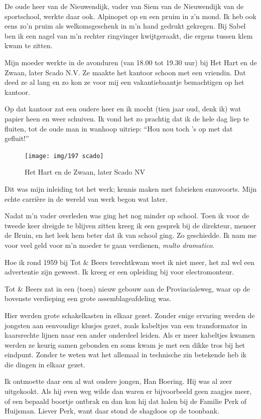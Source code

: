 \documentclass[10pt,twoside, openright]{memoir}
\begin{document}
De oude heer van de Nieuwendijk, vader van Siem van de Nieuwendijk van de sportschool, werkte daar ook. Alpinopet op en een pruim in z’n mond. Ik heb ook eens zo’n pruim als welkomsgeschenk in m’n hand gedrukt gekregen. Bij Sabel ben ik een nagel van m’n rechter ringvinger kwijtgeraakt, die ergens tussen klem kwam te zitten.

Mijn moeder werkte in de avonduren (van 18.00 tot 19.30 uur) bij Het Hart en de Zwaan, later Scado N.V. Ze maakte het kantoor schoon met een vriendin. Dat deed ze al lang en zo kon ze voor mij een vakantiebaantje bemachtigen op het kantoor. 

Op dat kantoor zat een oudere heer en ik mocht (tien jaar oud, denk ik) wat papier heen en weer schuiven. Ik vond het zo prachtig dat ik de hele dag liep te fluiten, tot de oude man in wanhoop uitriep: ``Hou nou toch ’s op met dat gefluit!''

\begin{figure}
\texttt{[image: img/197 scado]}
\caption*{\footnotesize Het Hart en de Zwaan, later Scado NV}
\end{figure}

Dit was mijn inleiding tot het werk; kennis maken met fabrieken enzovoorts. Mijn echte carrière in de wereld van werk begon wat later.

Nadat m’n vader overleden was ging het nog minder op school. Toen ik voor de tweede keer dreigde te blijven zitten kreeg ik een gesprek bij de direkteur, meneer de Bruin, en het leek hem beter dat ik van school ging. Zo geschiedde. Ik nam me voor veel geld voor m’n moeder te gaan verdienen, \emph{multo dramatico}.

Hoe ik rond 1959 bij Tot \& Beers terechtkwam weet ik niet meer, het zal wel een advertentie zijn geweest. Ik kreeg er een opleiding bij voor electromonteur.

Tot \& Beers zat in een (toen) nieuw gebouw aan de Provincialeweg, waar op de bovenste verdieping een grote assemblageafdeling was. 

Hier werden grote schakelkasten in elkaar gezet. Zonder enige ervaring werden de jongsten aan eenvoudige klusjes gezet, zoals kabeltjes van een transformator in kaarsrechte lijnen naar een ander onderdeel leiden. Als er meer kabeltjes kwamen werden ze keurig samen gebonden en soms kwam je met een dikke tros bij het eindpunt. Zonder te weten wat het allemaal in technische zin betekende heb ik die dingen in elkaar gezet. 

Ik ontmoette daar een al wat oudere jongen, Han Boering. Hij was al zeer uitgekookt. Als hij even weg wilde dan waren er bijvoorbeeld geen zaagjes meer, of een bepaald boortje ontbrak en dan kon hij dat halen bij de Familie Perk of Huijsman. Liever Perk, want daar stond de shagdoos op de toonbank. 
\end{document}
